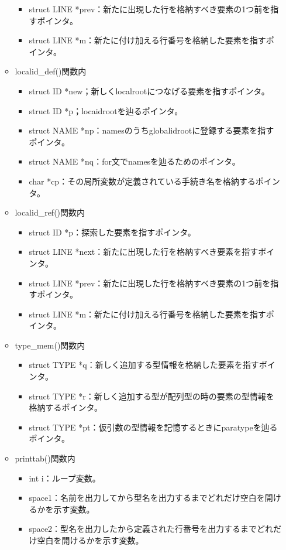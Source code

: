 \documentclass{jarticle}
\begin{document}
\begin{itemize}
\begin{itemize}
\begin{itemize}
      \item struct LINE *prev：新たに出現した行を格納すべき要素の1つ前を指すポインタ。
      \item struct LINE *m：新たに付け加える行番号を格納した要素を指すポインタ。
    \end{itemize}
    \item localid\_def()関数内
    \begin{itemize}
      \item struct ID *new；新しくlocalrootにつなげる要素を指すポインタ。
      \item struct ID *p；locaidrootを辿るポインタ。
      \item struct NAME *np：namesのうちglobalidrootに登録する要素を指すポインタ。
      \item struct NAME *nq：for文でnamesを辿るためのポインタ。
      \item char *cp：その局所変数が定義されている手続き名を格納するポインタ。
    \end{itemize}
    \item localid\_ref()関数内
    \begin{itemize}
      \item struct ID *p：探索した要素を指すポインタ。
      \item struct LINE *next：新たに出現した行を格納すべき要素を指すポインタ。
      \item struct LINE *prev：新たに出現した行を格納すべき要素の1つ前を指すポインタ。
      \item struct LINE *m：新たに付け加える行番号を格納した要素を指すポインタ。
    \end{itemize}
    \item type\_mem()関数内
    \begin{itemize}
      \item struct TYPE *q：新しく追加する型情報を格納した要素を指すポインタ。
      \item struct TYPE *r：新しく追加する型が配列型の時の要素の型情報を格納するポインタ。
      \item struct TYPE *pt：仮引数の型情報を記憶するときにparatypeを辿るポインタ。
    \end{itemize}
    \item printtab()関数内
    \begin{itemize}
      \item int i：ループ変数。
      \item space1：名前を出力してから型名を出力するまでどれだけ空白を開けるかを示す変数。
      \item space2：型名を出力したから定義された行番号を出力するまでどれだけ空白を開けるかを示す変数。

\end{itemize}
\end{itemize}
\end{itemize}
\end{document}
